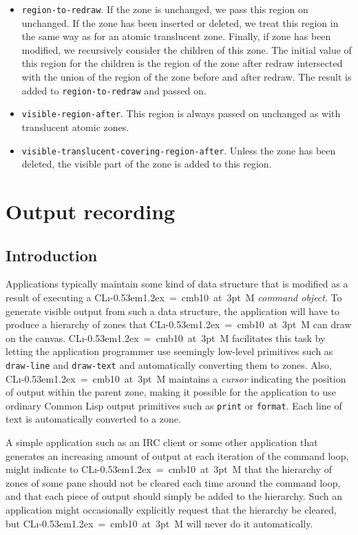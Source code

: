 \documentclass{report}
\def\Tiny{ \font\Tinyfont = cmb10 at 3pt \relax  \Tinyfont}
\def\cl{Common Lisp}
\def\clim{\textsf{CL{\i}\kern-0.53em\raise1.2ex\hbox{\Tiny 3}M}}
\def\code#1{\texttt{#1}}
\begin{document}
\begin{itemize}
\item \texttt{region-to-redraw}.  If the zone is unchanged, we pass
  this region on unchanged.  If the zone has been inserted or
  deleted, we treat this region in the same way as for an atomic
  translucent zone.  Finally, if zone has been modified, we
  recursively consider the children of this zone.  The initial value
  of this region for the children is the region of the zone after
  redraw intersected with the union of the region of the zone
  before and after redraw.  The result is added to
  \texttt{region-to-redraw} and passed on.
\item \texttt{visible-region-after}.  This region is always passed on
  unchanged as with translucent atomic zones. 
\item \texttt{visible-translucent-covering-region-after}.  Unless the
  zone has been deleted, the visible part of the zone is added to
  this region.
\end{itemize}

\chapter{Output recording}

\section{Introduction}

Applications typically maintain some kind of data structure that is
modified as a result of executing a \clim{} \emph{command object}.  To
generate visible output from such a data structure, the application
will have to produce a hierarchy of zones that \clim{} can draw on
the canvas.  \clim{} facilitates this task by letting the application
programmer use seemingly low-level primitives such as \code{draw-line}
and \code{draw-text} and automatically converting them to zones.
Also, \clim{} maintains a \emph{cursor} indicating the position of
output within the parent zone, making it possible for the
application to use ordinary \cl{} output primitives such as
\code{print} or \code{format}.  Each line of text is automatically
converted to a zone. 

A simple application such as an IRC client or some other application
that generates an increasing amount of output at each iteration of the
command loop, might indicate to \clim{} that the hierarchy of zones
of some pane should not be cleared each time around the command loop,
and that each piece of output should simply be added to the
hierarchy.  Such an application might occasionally explicitly request
that the hierarchy be cleared, but \clim{} will never do it
automatically. 
\end{document}
